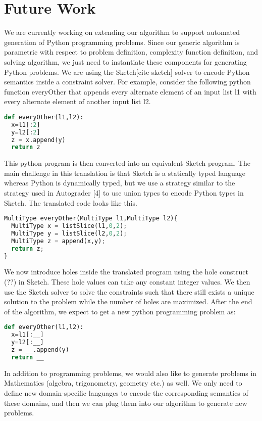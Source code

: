 \section{Future Work}

We are currently working on extending our algorithm to support automated generation of Python programming problems. Since our generic algorithm is parametric with respect to problem definition, complexity function definition, and solving algorithm, we just need to instantiate these components for generating Python problems. We are using the Sketch[cite sketch] solver to encode Python semantics inside a constraint solver. For example, consider the following python function everyOther that appends every alternate element of an input list l1 with every alternate element of another input list l2.

\singlespace
\begin{lstlisting}[language=Python, frame=single]
def everyOther(l1,l2):
  x=l1[:2]
  y=l2[:2]
  z = x.append(y)
  return z

\end{lstlisting}
\doublespace

This python program is then converted into an equivalent Sketch program. The main challenge in this translation is that Sketch is a statically typed language whereas Python is dynamically typed, but we use a strategy similar to the strategy used in Autograder [4] to use union types to encode Python types in Sketch. The translated code looks like this.

\singlespace
\begin{lstlisting}[language=Python, frame=single]
MultiType everyOther(MultiType l1,MultiType l2){
  MultiType x = listSlice(l1,0,2);
  MultiType y = listSlice(l2,0,2);
  MultiType z = append(x,y);
  return z;
}
\end{lstlisting}
\doublespace

We now introduce holes inside the translated program using the hole construct (??) in Sketch. These hole values can take any constant integer values. We then use the Sketch solver to solve the constraints such that there still exists a unique solution to the problem while the number of holes are maximized. After the end of the algorithm, we expect to get a new python programming problem as:

\singlespace
\begin{lstlisting}[language=Python, frame=single]
def everyOther(l1,l2):
  x=l1[:__]
  y=l2[:__]
  z = __.append(y)
  return __
\end{lstlisting}
\doublespace

In addition to programming problems, we would also like to generate problems in Mathematics (algebra, trigonometry, geometry etc.) as well. We only need to define new domain-specific languages to encode the corresponding semantics of these domains, and then we can plug them into our algorithm to generate new problems.
